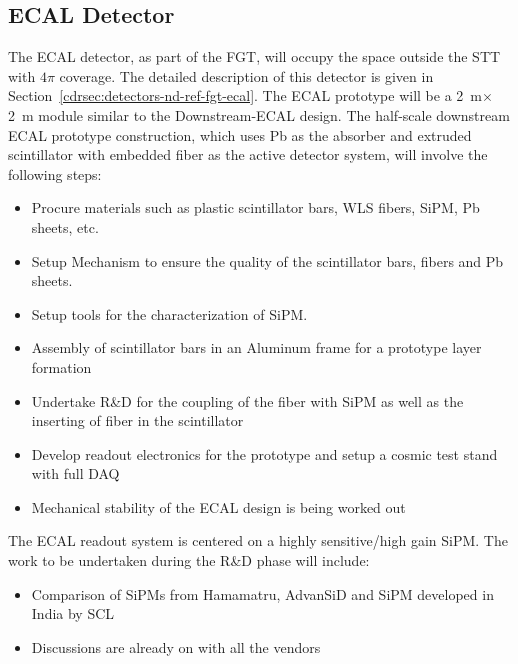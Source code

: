 \subsection{ECAL Detector} 


The ECAL detector, as part of the FGT, will occupy the space outside
the STT with $4\pi$ coverage.  The detailed description of this
detector is given in Section~\ref{cdrsec:detectors-nd-ref-fgt-ecal}.
The ECAL prototype will be a 2~m$\times$2~m module similar to the
Downstream-ECAL design.  The half-scale downstream ECAL prototype
construction, which uses Pb as the absorber and extruded scintillator
with embedded fiber as the active detector system, will involve the
following steps:

\begin{itemize} 
\item Procure materials such as plastic scintillator bars, WLS fibers, SiPM, Pb sheets, etc.
\item Setup Mechanism to ensure the quality of the scintillator bars, fibers and Pb sheets.
\item Setup tools for the characterization of SiPM.
\item Assembly of scintillator bars in an Aluminum frame for a prototype layer formation
\item Undertake R\&D for the coupling of the fiber with SiPM as well as the inserting of fiber in the scintillator
\item Develop readout electronics for the prototype and setup a cosmic test stand with full DAQ
\item Mechanical stability of the ECAL design is being worked out
\end{itemize} 

The ECAL readout system is centered on a highly sensitive/high gain SiPM. The work to be undertaken 
during the R\&D phase will include:
\begin{itemize}
\item Comparison of SiPMs from Hamamatru, AdvanSiD and SiPM developed in India by SCL
\item Discussions are already on with all the vendors
\end{itemize} 

